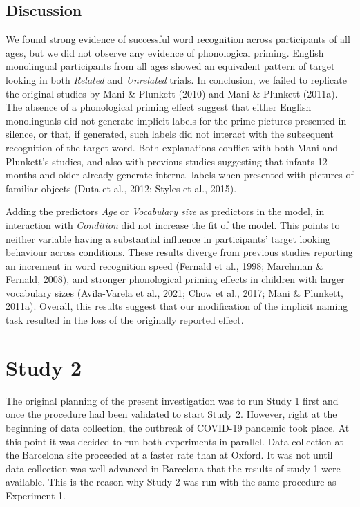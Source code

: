 \documentclass[
  12pt,
  b5paperpaper,
  twoside]{scrreprt}
\begin{document}
\hypertarget{discussion}{%
\subsection{Discussion}\label{discussion}}

We found strong evidence of successful word recognition across
participants of all ages, but we did not observe any evidence of
phonological priming. English monolingual participants from all ages
showed an equivalent pattern of target looking in both \emph{Related}
and \emph{Unrelated} trials. In conclusion, we failed to replicate the
original studies by Mani \& Plunkett (2010) and Mani \& Plunkett
(2011a). The absence of a phonological priming effect suggest that
either English monolinguals did not generate implicit labels for the
prime pictures presented in silence, or that, if generated, such labels
did not interact with the subsequent recognition of the target word.
Both explanations conflict with both Mani and Plunkett's studies, and
also with previous studies suggesting that infants 12-months and older
already generate internal labels when presented with pictures of
familiar objects (Duta et al., 2012; Styles et al., 2015).

Adding the predictors \emph{Age} or \emph{Vocabulary size} as predictors
in the model, in interaction with \emph{Condition} did not increase the
fit of the model. This points to neither variable having a substantial
influence in participants' target looking behaviour across conditions.
These results diverge from previous studies reporting an increment in
word recognition speed (Fernald et al., 1998; Marchman \& Fernald,
2008), and stronger phonological priming effects in children with larger
vocabulary sizes (Avila-Varela et al., 2021; Chow et al., 2017; Mani \&
Plunkett, 2011a). Overall, this results suggest that our modification of
the implicit naming task resulted in the loss of the originally reported
effect.

\hypertarget{study-2}{%
\section{Study 2}\label{study-2}}

The original planning of the present investigation was to run Study 1
first and once the procedure had been validated to start Study 2.
However, right at the beginning of data collection, the outbreak of
COVID-19 pandemic took place. At this point it was decided to run both
experiments in parallel. Data collection at the Barcelona site proceeded
at a faster rate than at Oxford. It was not until data collection was
well advanced in Barcelona that the results of study 1 were available.
This is the reason why Study 2 was run with the same procedure as
Experiment 1.
\end{document}
